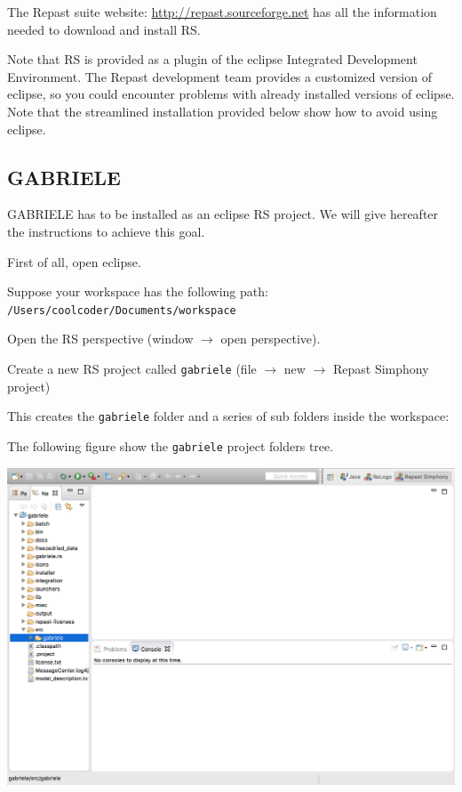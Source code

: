 \documentclass{book}
\begin{document}
The Repast suite website: \url{http://repast.sourceforge.net} has all the information needed to download and install RS.

Note that RS is provided as a plugin of the eclipse Integrated Development Environment. The Repast development team provides a customized version of eclipse, so you could encounter problems with already installed versions of eclipse. Note that the streamlined installation provided below show how to avoid using eclipse.

\subsection{GABRIELE}

GABRIELE has to be installed as an eclipse RS project. We will give hereafter the instructions to achieve this goal.

First of all, open eclipse.%

Suppose your workspace has the following path:\\
\verb+/Users/coolcoder/Documents/workspace+

Open the RS perspective (window $\rightarrow$ open perspective).

Create a new RS project called \verb+gabriele+ (file $\rightarrow$ new $\rightarrow$ Repast Simphony project)

This creates the \verb+gabriele+ folder and a series of sub folders inside the workspace:

The following figure show the \verb+gabriele+ project folders tree.

\vskip2mm
\noindent
\includegraphics[scale=0.35]{fig_gabriele_rs_navigation}
\end{document}

